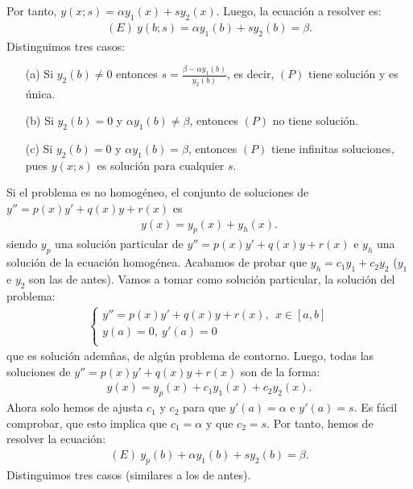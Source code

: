Por tanto, $y(x;s) = \alpha y_1(x) + sy_2(x)$. Luego, la ecuación a resolver es:
\begin{align*}
    (E) \ y(b;s) = \alpha y_1(b) + sy_2(b) = \beta.
\end{align*}
Distinguimos tres casos:
\begin{enumerate}
    \item[(a)] Si $y_2(b) \not = 0$ entonces $s = \frac{\beta - \alpha y_1(b)}{y_2(b)}$, es decir, $(P)$ tiene solución y es única.
    \item[(b)] Si $y_2(b) = 0$ y $\alpha y_1(b) \not = \beta$, entonces $(P)$ no tiene solución.
    \item[(c)] Si $y_2(b) = 0$ y $\alpha y_1(b)  = \beta$, entonces $(P)$ tiene infinitas soluciones, pues $y(x;s)$ es solución para cualquier $s$.
\end{enumerate}
Si el problema es no homogéneo, el conjunto de soluciones de $y'' = p(x)y' + q(x)y + r(x)$ es
\begin{align*}
    y(x) = y_p(x) + y_h(x).
\end{align*}
siendo $y_p$ una solución particular de $y'' = p(x)y' + q(x)y + r(x)$ e $y_h$ una solución de la ecuación homogénea. Acabamos de probar que $y_h = c_1y_1 + c_2y_2$ ($y_1$ e $y_2$ son las de antes). Vamos a tomar como solución particular, la solución del problema:
\begin{align*}
    \left\{ \begin{array}{lcc}
                y'' = p(x)y' + q(x)y + r(x), \ \ x \in [a,b] \\
                y(a) = 0, \ y'(a) = 0                        \\
            \end{array}
    \right.
\end{align*}
que es solución ademñas, de algún problema de contorno. Luego, todas las soluciones de $y'' = p(x)y' + q(x)y + r(x)$ son de la forma:
\begin{align*}
    y(x) = y_p(x) + c_1y_1(x) + c_2y_2(x).
\end{align*}
Ahora solo hemos de ajusta $c_1$ y $c_2$ para que $y'(a) = \alpha$ e $y'(a) = s$. Es fácil comprobar, que esto implica que $c_1 = \alpha$ y que $c_2 = s$. Por tanto, hemos de resolver la ecuación:
\begin{align*}
    (E) \ y_p(b) + \alpha y_1(b) + s y_2(b) = \beta.
\end{align*}
Distinguimos tres casos (similares a los de antes).

